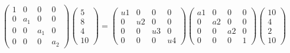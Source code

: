 \begin{equation}
\begin{pmatrix}
  1 & 0 & 0  & 0 \\
  0 & a_1 & 0 & 0 \\
  0 & 0 & a_1  & 0 \\
  0 & 0 & 0 & a_2 
 \end{pmatrix}
\begin{pmatrix}
  5  \\
  8  \\
  4  \\
  10
 \end{pmatrix}
=
\begin{pmatrix}
  u1 & 0 & 0  & 0 \\
  0 & u2 & 0 & 0 \\
  0 & 0 & u3  & 0 \\
  0 & 0 & 0 & u4 
 \end{pmatrix}
\begin{pmatrix}
  a1 & 0 & 0  & 0 \\
  0 & a2 & 0 & 0 \\
  0 & 0 & a2  & 0 \\
  0 & 0 & 0 & 1 
 \end{pmatrix}
 \begin{pmatrix}
  10  \\
  4  \\
  2  \\
  10  
 \end{pmatrix}\end{equation}

